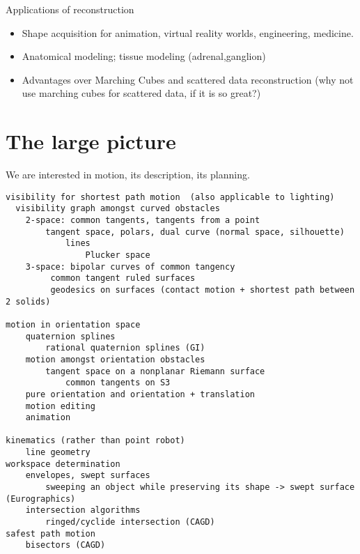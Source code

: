 \documentclass[11pt,titlepage]{article}
\begin{document}
\vspace{.5in}

Applications of reconstruction
\begin{itemize}
\item	Shape acquisition for animation, virtual reality worlds, 
	engineering, medicine.
\item	Anatomical modeling; tissue modeling (adrenal,ganglion)
\item   Advantages over Marching Cubes and scattered data reconstruction
	(why not use marching cubes for scattered data, if it is so great?)
\end{itemize}

\clearpage

\vspace{-.5in}

\section{The large picture}

We are interested in motion, its description, its planning.
%
\begin{verbatim}
visibility for shortest path motion	 (also applicable to lighting)
  visibility graph amongst curved obstacles
	2-space: common tangents, tangents from a point
		tangent space, polars, dual curve (normal space, silhouette)
	 		lines
				Plucker space
	3-space: bipolar curves of common tangency
		 common tangent ruled surfaces
		 geodesics on surfaces (contact motion + shortest path between 2 solids)
				
motion in orientation space
	quaternion splines
		rational quaternion splines (GI)
	motion amongst orientation obstacles
		tangent space on a nonplanar Riemann surface
			common tangents on S3
	pure orientation and orientation + translation
	motion editing
	animation
				
kinematics (rather than point robot)
	line geometry
workspace determination
	envelopes, swept surfaces
		sweeping an object while preserving its shape -> swept surface (Eurographics)
	intersection algorithms
		ringed/cyclide intersection (CAGD)
safest path motion
	bisectors (CAGD)
\end{verbatim}
\end{document}
